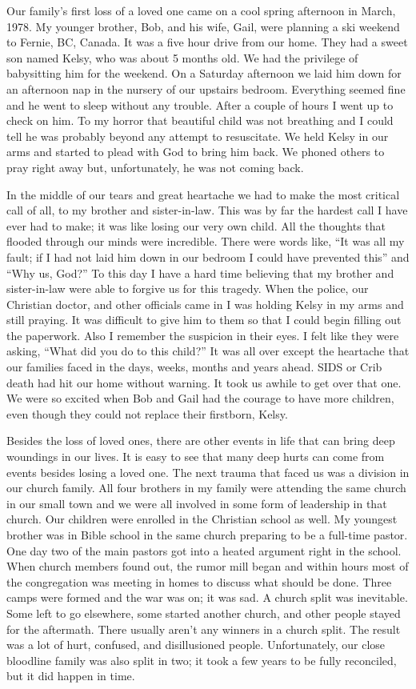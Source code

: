 \documentclass[oneside]{book}
\begin{document}
Our family’s first loss of a loved one came on a cool spring afternoon in March, 1978. My  younger brother, Bob, and his wife, Gail, were planning a ski weekend to Fernie, BC, Canada. It was a five hour drive from our home. They had a sweet son named Kelsy, who was about 5 months old. We had the privilege of babysitting him for the weekend. On a Saturday afternoon we laid him down for an afternoon nap in the nursery of our upstairs bedroom. Everything seemed fine and he went to sleep without any trouble. After a couple of hours I went up to check on him. To my horror that beautiful child was not breathing and I could tell he was probably beyond any attempt to resuscitate. We held Kelsy in our arms and started to plead with God to bring him back. We phoned others to pray right away but, unfortunately, he was not coming back. 

In the middle of our tears and great heartache we had to make the most critical call of all, to my brother and sister-in-law. This was by far the hardest call I have ever had to make; it was like losing our very own child. All the thoughts that flooded through our minds were incredible. There were words like, “It was all my fault; if I had not laid him down in our bedroom I could have prevented this” and “Why us, God?” To this day I have a hard time believing that my brother and sister-in-law were able to forgive us for this tragedy. When the police, our Christian doctor, and other officials came in I was holding Kelsy in my arms and still praying. It was difficult to give him to them so that I could begin filling out the paperwork. Also I remember the suspicion in their eyes. I felt like they were asking, “What did you do to this child?” It was all over except the heartache that our families faced in the days, weeks, months and years ahead. SIDS or Crib death had hit our home without warning. It took us awhile to get over that one. We were so excited when Bob and Gail had the courage to have more children, even though they could not replace their firstborn, Kelsy.

Besides the loss of loved ones, there are other events in life that can bring deep woundings in our lives. It is easy to see that many deep hurts can come from events besides losing a loved one. The next trauma that faced us was a division in our church family. All four brothers in my family were attending the same church in our small town and we were all involved in some form of leadership in that church. Our children were enrolled in the Christian school as well. My youngest brother was in Bible school in the same church preparing to be a full-time pastor. One day two of the main pastors got into a heated argument right in the school. When church members found out, the rumor mill began and within hours most of the congregation was meeting in homes to discuss what should be done. Three camps were formed and the war was on; it was sad. A church split was inevitable. Some left to go elsewhere, some started another church, and other people stayed for the aftermath. There usually aren't any winners in a church split. The result was a lot of hurt, confused, and disillusioned people. Unfortunately, our close bloodline family was also split in two; it took a few years to be fully reconciled, but it did happen in time. 
\end{document}
